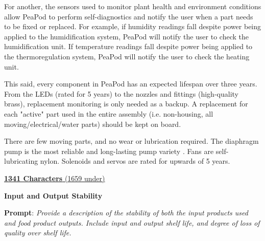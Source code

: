 \documentclass{../tex/report}
\begin{document}
For another, the sensors used to monitor plant health and environment conditions allow PeaPod to perform self-diagnostics and notify the user when a part needs to be fixed or replaced. For example, if humidity readings fall despite power being applied to the humidification system, PeaPod will notify the user to check the humidification unit. If temperature readings fall despite power being applied to the thermoregulation system, PeaPod will notify the user to check the heating unit.

This said, every component in PeaPod has an expected lifespan over three years. From the LEDs (rated for 5 years) to the nozzles and fittings (high-quality brass), replacement monitoring is only needed as a backup. A replacement for each "active" part used in the entire assembly (i.e. non-housing, all moving/electrical/water parts) should be kept on board.

There are few moving parts, and no wear or lubrication required. The diaphragm pump is the most reliable and long-lasting pump variety \cite{diaphragm}. Fans are self-lubricating nylon. Solenoids and servos are rated for upwards of 5 years.

\uline{\textbf{1341 Characters} (1659 under)}


\vspace{0.5cm}

\textbf{Input and Output Stability}
\label{sec:reliability-inputoutput}

\textbf{Prompt}: \textit{Provide a description of the stability of both the input products used and food product outputs. Include input and output shelf life, and degree of loss of quality over shelf life.}
\end{document}
